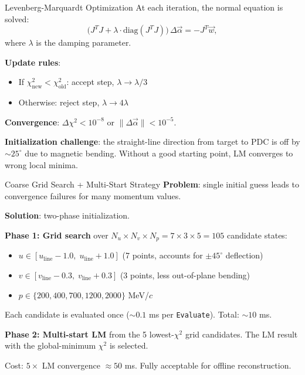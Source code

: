 \documentclass[aspectratio=169]{beamer}
\begin{document}
\begin{frame}{Levenberg-Marquardt Optimization}
\small
At each iteration, the normal equation is solved:
\[
\bigl(J^T J + \lambda \cdot \mathrm{diag}(J^T J)\bigr)\,\Delta\vec{\alpha} = -J^T \vec{w},
\]
where $\lambda$ is the damping parameter.

\textbf{Update rules}:
\begin{itemize}
\item If $\chi^2_\mathrm{new} < \chi^2_\mathrm{old}$: accept step, $\lambda \to \lambda / 3$
\item Otherwise: reject step, $\lambda \to 4\lambda$
\end{itemize}

\textbf{Convergence}: $\Delta\chi^2 < 10^{-8}$ or $\|\Delta\vec{\alpha}\| < 10^{-5}$.

\vspace{0.2cm}
\textbf{Initialization challenge}: the straight-line direction from target to PDC is off by $\sim\!25^\circ$ due to magnetic bending. Without a good starting point, LM converges to wrong local minima.
\end{frame}

\begin{frame}{Coarse Grid Search + Multi-Start Strategy}
\small
\textbf{Problem}: single initial guess leads to convergence failures for many momentum values.

\textbf{Solution}: two-phase initialization.

\vspace{0.1cm}
\textbf{Phase 1: Grid search} over $N_u \times N_v \times N_p = 7 \times 3 \times 5 = 105$ candidate states:
\begin{itemize}
\item $u \in [u_\mathrm{line} - 1.0,\; u_\mathrm{line} + 1.0]$ (7 points, accounts for $\pm 45^\circ$ deflection)
\item $v \in [v_\mathrm{line} - 0.3,\; v_\mathrm{line} + 0.3]$ (3 points, less out-of-plane bending)
\item $p \in \{200, 400, 700, 1200, 2000\}$ MeV/$c$
\end{itemize}
Each candidate is evaluated once ($\sim\!0.1$ ms per \texttt{Evaluate}). Total: $\sim\!10$ ms.

\vspace{0.1cm}
\textbf{Phase 2: Multi-start LM} from the 5 lowest-$\chi^2$ grid candidates. The LM result with the global-minimum $\chi^2$ is selected.

Cost: $5 \times$ LM convergence $\approx 50$ ms. Fully acceptable for offline reconstruction.
\end{frame}
\end{document}
